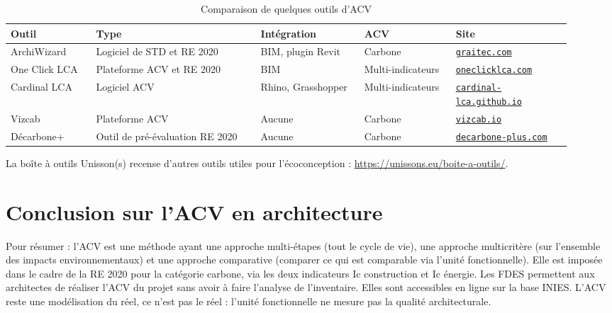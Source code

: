 \begin{table}[h]
\centering
\small
\setlength{\tabcolsep}{3pt}
\caption{Comparaison de quelques outils d'ACV}
\label{tab:outils}
\begin{tabular}{p{0.14\linewidth}p{0.27\linewidth}p{0.17\linewidth}p{0.15\linewidth}p{0.19\linewidth}}
\hline
\textbf{Outil} & \textbf{Type} & \textbf{Intégration} & \textbf{ACV} & \textbf{Site} \\
\hline
ArchiWizard & Logiciel de STD et RE 2020 & BIM, plugin Revit & Carbone & \footnotesize\href{https://www.graitec.com/fr/products/archiwizard/}{\nolinkurl{graitec.com}} \\
One Click LCA & Plateforme ACV et RE 2020 & BIM & Multi-indicateurs & \footnotesize\href{https://oneclicklca.com/fr/}{\nolinkurl{oneclicklca.com}} \\
Cardinal LCA & Logiciel ACV & Rhino, Grasshopper & Multi-indicateurs & \footnotesize\href{https://cardinal-lca.github.io/website/}{\nolinkurl{cardinal-lca.github.io}} \\
Vizcab & Plateforme ACV & Aucune & Carbone & \footnotesize\href{https://vizcab.io/fr/}{\nolinkurl{vizcab.io}} \\
Décarbone+ & Outil de pré-évaluation RE 2020 & Aucune & Carbone & \footnotesize\href{https://www.decarbone-plus.com/}{\nolinkurl{decarbone-plus.com}} \\
\hline
\end{tabular}
\end{table}

La boîte à outils Unisson(s) recense d'autres outils utiles pour l'écoconception : \url{https://unissons.eu/boite-a-outils/}.


\chapter{Conclusion sur l'ACV en architecture}
\label{chap:conclusion}
Pour résumer : l'ACV est une méthode ayant une approche multi-étapes (tout le cycle de vie), une approche multicritère (sur l'ensemble des impacts environnementaux) et une approche comparative (comparer ce qui est comparable via l'unité fonctionnelle). Elle est imposée dans le cadre de la RE 2020 pour la catégorie carbone, via les deux indicateurs Ic construction et Ic énergie.
Les FDES permettent aux architectes de réaliser l'ACV du projet sans avoir à faire l'analyse de l'inventaire. Elles sont accessibles en ligne sur la base INIES.
L'ACV reste une modélisation du réel, ce n'est pas le réel : l'unité fonctionnelle ne mesure pas la qualité architecturale.


